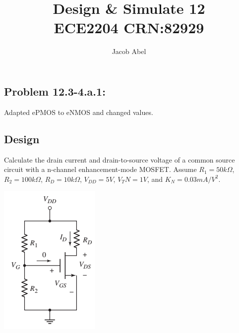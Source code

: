 \documentclass[12pt,letterpaper,titlepage]{article}
\author{Jacob Abel}
\title{	Design \& Simulate 12
	\\\large ECE2204 CRN:82929
}
\begin{document}
\maketitle
\begin{raggedright}

\section{Problem 12.3-4.a.1: } Adapted ePMOS to eNMOS and changed values.
\subsection{Design}

Calculate the drain current and drain-to-source voltage of a common source circuit with a n-channel enhancement-mode MOSFET. Assume $R_1 = 50k\Omega$, $R_2 = 100k\Omega$, $R_D = 10k\Omega$, $V_{DD} = 5V$, $V_TN = 1V$, and $K_N = 0.03 mA/V^2$.

\begin{center}
\includegraphics[width=\textwidth, height=12\baselineskip, keepaspectratio=true]{ds1}
\end{center}


\end{raggedright}
\end{document}
